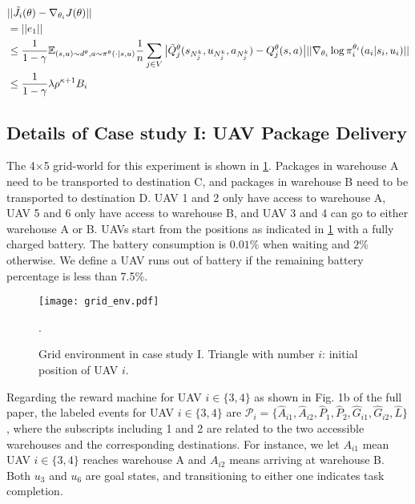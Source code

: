 \documentclass[conf]{new-aiaa}
\begin{document}
\begin{equation}
    \begin{aligned}
        & || \Tilde{J}_i(\theta) - \nabla_{\theta_i} J(\theta)||  \\
        & = ||e_1|| \\
        & \le \frac{1}{1-\gamma} \mathbb{E}_{(s,u) \sim d^\theta, a \sim \pi^\theta(\cdot |s,u)} \frac{1}{n} \sum_{j \in V} \big |\Tilde{Q}_j^\theta(s_{N_j^k},u_{N_j^k}, a_{N_j^k}) - Q_j^\theta(s, a) \big |  ||\nabla_{\theta_i} \log \pi_i^{\theta_i}(a_i|s_i, u_i)|| \\
        & \le \frac{1}{1-\gamma} \lambda \rho^{\kappa+1} B_i
    \end{aligned}
\end{equation}

\subsection{Details of Case study I: UAV Package Delivery}

The 4$\times$5 grid-world for this experiment is shown in \cref{grid_env}. Packages in warehouse A need to be transported to destination C, and packages in warehouse B need to be transported to destination D. UAV 1 and 2 only have access to warehouse A, UAV 5 and 6 only have access to warehouse B, and UAV 3 and 4 can go to either warehouse A or B. UAVs start from the positions as indicated in \cref{grid_env} with a fully charged battery. The battery consumption is $0.01\%$ when waiting and $2\%$ otherwise. We define a UAV runs out of battery if the remaining battery percentage is less than 7.5\%.

\begin{figure}[H]
\centering
\texttt{[image: grid\_env.pdf]}
\caption{Grid environment in case study I. Triangle with number $i$: initial position of UAV $i$.}.
\label{grid_env}
\end{figure}

Regarding the reward machine for UAV $i\in \{3, 4\}$ as shown in Fig. 1b of the full paper, the labeled events for UAV $i\in \{3, 4\}$ are $\mathcal{P}_i = \{\hat{A}_{i1}, \hat{A}_{i2}, \hat{P}_1, \hat{P}_2, \hat{G}_{i1}, \hat{G}_{i2}, \hat{L} \}$, where the subscripts including 1 and 2 are related to the two accessible warehouses and the corresponding destinations. For instance, we let $A_{i1}$ mean UAV $i\in \{3, 4\}$ reaches warehouse A and $A_{i2}$ means arriving at warehouse B. Both $u_3$ and $u_6$ are goal states, and transitioning to either one indicates task completion.
\end{document}
